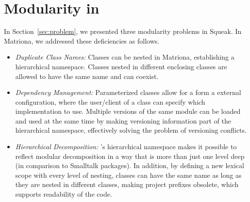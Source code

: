 \section{Modularity in \msname}
In Section~\ref{sec:problem}, we presented three modularity problems in Squeak. In Matriona, we addressed these deficiencies as follows.

\begin{itemize}
	\item \emph{Duplicate Class Names:} Classes can be nested in Matriona, establishing a hierarchical namespace. Classes nested in different enclosing classes are allowed to have the same name and can coexist.
	\item \emph{Dependency Management:} Parameterized classes allow for a form a external configuration, where the user/client of a class can specify which implementation to use. Multiple versions of the same module can be loaded and used at the same time by making versioning information part of the hierarchical namespace, effectively solving the problem of versioning conflicts.
	\item \emph{Hierarchical Decomposition:} \msname's hierarchical namespace makes it possible to reflect modular decomposition in a way that is more than just one level deep (in comparison to Smalltalk packages). In addition, by defining a new lexical scope with every level of nesting, classes can have the same name as long as they are nested in different classes, making project prefixes obsolete, which supports readability of the code.
\end{itemize}

